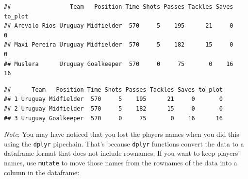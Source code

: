 \documentclass[]{book}
\makeatletter
\newenvironment{Shaded}{\begin{snugshade}}{\end{snugshade}}
\newcommand{\KeywordTok}[1]{\textcolor[rgb]{0.13,0.29,0.53}{\textbf{#1}}}
\newcommand{\DataTypeTok}[1]{\textcolor[rgb]{0.13,0.29,0.53}{#1}}
\newcommand{\StringTok}[1]{\textcolor[rgb]{0.31,0.60,0.02}{#1}}
\newcommand{\OperatorTok}[1]{\textcolor[rgb]{0.81,0.36,0.00}{\textbf{#1}}}
\newcommand{\NormalTok}[1]{#1}
\newenvironment{kframe}{%
\medskip{}
\setlength{\fboxsep}{.8em}
 \def\at@end@of@kframe{}%
 \ifinner\ifhmode%
  \def\at@end@of@kframe{\end{minipage}}%
  \begin{minipage}{\columnwidth}%
 \fi\fi%
 \def\FrameCommand##1{\hskip\@totalleftmargin \hskip-\fboxsep
 \colorbox{shadecolor}{##1}\hskip-\fboxsep
     \hskip-\linewidth \hskip-\@totalleftmargin \hskip\columnwidth}%
 \MakeFramed {\advance\hsize-\width
   \@totalleftmargin\z@ \linewidth\hsize
   \@setminipage}}%
 {\par\unskip\endMakeFramed%
 \at@end@of@kframe}
\renewenvironment{Shaded}{\begin{kframe}}{\end{kframe}}
\theoremstyle{definition}
\theoremstyle{definition}
\theoremstyle{definition}
\theoremstyle{remark}
\makeatother
\begin{document}
\begin{Shaded}
\end{Shaded}

\begin{verbatim}
##                 Team   Position Time Shots Passes Tackles Saves to_plot
## Arevalo Rios Uruguay Midfielder  570     5    195      21     0       0
## Maxi Pereira Uruguay Midfielder  570     5    182      15     0       0
## Muslera      Uruguay Goalkeeper  570     0     75       0    16      16
\end{verbatim}

\begin{Shaded}
\end{Shaded}

\begin{verbatim}
##      Team   Position Time Shots Passes Tackles Saves to_plot
## 1 Uruguay Midfielder  570     5    195      21     0       0
## 2 Uruguay Midfielder  570     5    182      15     0       0
## 3 Uruguay Goalkeeper  570     0     75       0    16      16
\end{verbatim}

\emph{Note}: You may have noticed that you lost the players names when
you did this using the \texttt{dplyr} pipechain. That's because
\texttt{dplyr} functions convert the data to a dataframe format that
does not include rownames. If you want to keep players' names, use
\texttt{mutate} to move those names from the rownames of the data into a
column in the dataframe:

\begin{Shaded}
\end{Shaded}
\end{document}
